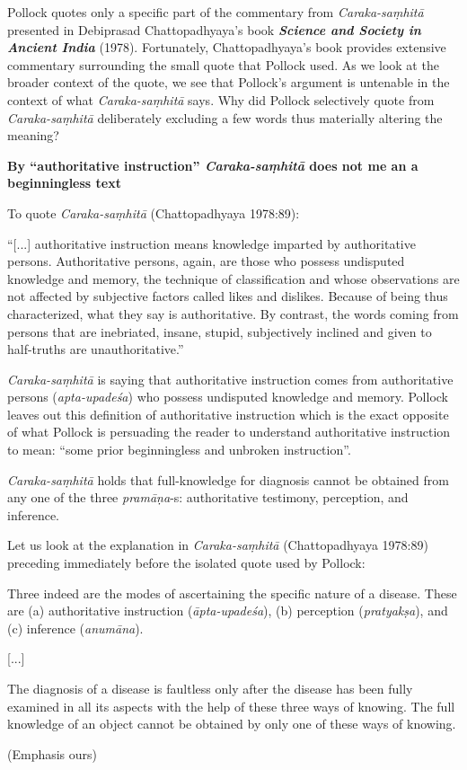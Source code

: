 \newpage

Pollock quotes only a specific part of the commentary from {\sl Caraka-saṃhitā} presented in Debiprasad Chattopadhyaya's book {\sl\bfseries Science and Society in Ancient India} (1978).  Fortunately, Chattopadhyaya's book provides extensive commentary surrounding the small quote that Pollock used. As we look at the broader context of the quote, we see that Pollock's argument is untenable in the context of what {\sl Caraka-saṃhitā} says. Why did Pollock selectively quote from {\sl Caraka-saṃhitā} deliberately excluding a few words thus materially altering the meaning?

{\bf By ``authoritative instruction'' {{\sl\bfseries Caraka-saṃhitā}\relax} does not me	an a beginningless text}

To quote {\sl Caraka-saṃhitā} (Chattopadhyaya 1978:89):
\begin{myquote}
``[...] authoritative instruction means knowledge imparted by authoritative persons. Authoritative persons, again, are those who possess undisputed knowledge and memory, the technique of classification and whose observations are not affected by subjective factors called likes and dislikes. Because of being thus characterized, what they say is authoritative.  By contrast, the words coming from persons that are inebriated, insane, stupid, subjectively inclined and given to half-truths are unauthoritative.''
\end{myquote}

{\sl Caraka-saṃhitā} is saying that authoritative instruction comes from authoritative persons ({\sl apta-upadeśa}) who possess undisputed knowledge and memory. Pollock leaves out this definition of authoritative instruction which is the exact opposite of what Pollock is persuading the reader to understand authoritative instruction to mean: ``some prior beginningless and unbroken instruction''.

{\sl Caraka-saṃhitā} holds that full-knowledge for diagnosis cannot be obtained from any one of the three {\sl pramāṇa}-s: authoritative testimony, perception, and inference.

Let us look at the explanation in {\sl Caraka-saṃhitā} (Chattopadhyaya 1978:89) preceding immediately before the isolated quote used by Pollock:
\begin{myquote}
Three indeed are the modes of ascertaining the specific nature of a disease. These are (a) authoritative instruction ({\sl āpta-upadeśa}), (b) perception ({\sl pratyakṣa}), and (c) inference ({\sl anumāna}).

[...]

The diagnosis of a disease is faultless only after the disease has been fully examined in all its aspects with the help of these three ways of knowing. The full knowledge of an object cannot be obtained by only one of these ways of knowing.

\hfill (Emphasis ours)
\end{myquote}

